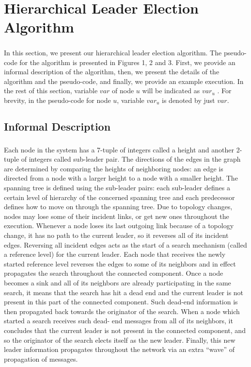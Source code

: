 \chapter{Hierarchical Leader Election Algorithm}
\paragraph{}In this section, we present our hierarchical leader election algorithm. The pseudo-code for the algorithm is presented in Figures 1, 2 and 3. First, we provide an informal description of the algorithm, then, we present the details of the algorithm and the pseudo-code, and finally, we provide an example execution. In the rest of this section, variable $var$ of node $u$ will be indicated as $var_u$ . For brevity, in the pseudo-code for node $u$, variable $var_u$ is denoted by just $var$.
\section{Informal Description}
\paragraph{}Each node in the system has a 7-tuple of integers called a height and another 2-tuple of integers called sub-leader pair. The directions of the edges in the graph are determined by comparing the heights of neighboring nodes: an edge is directed from a node with a larger height to a node with a smaller height. The spanning tree is defined using the sub-leader pairs: each sub-leader defines a certain level of hierarchy of the concerned spanning tree and each predecessor defines how to move on through the spanning tree. Due to topology changes, nodes may lose some of their incident links, or get new ones throughout the execution. Whenever a node loses its last outgoing link because of a topology change, it has no path to the current leader, so it reverses all of its incident edges. Reversing all incident edges acts as the start of a search mechanism (called a reference level) for the current leader. Each node that receives the newly started reference level reverses the edges to some of its neighbors and in effect propagates the search throughout the connected component. Once a node becomes a sink and all of its neighbors are already participating in the same search, it means that the search has hit a dead end and the current leader is not present in this part of the connected component. Such dead-end information is then propagated back towards the originator of the search. When a node which started a search receives such dead- end messages from all of its neighbors, it concludes that the current leader is not present in the connected component, and so the originator of the search elects itself as the new leader. Finally, this new leader information propagates throughout the network via an extra “wave” of propagation of messages.
